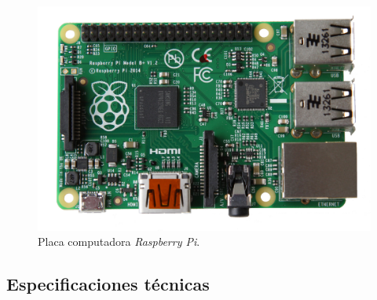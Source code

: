 \smallskip

\begin{figure}[H]
	\noindent \begin{centering}
		\includegraphics[width=\linewidth*2/3]{capitulo3/raspberry}
		\par\end{centering}
	\smallskip
	\caption{\label{fig:raspberry} Placa computadora \textit{Raspberry Pi}.}
\end{figure} 

\smallskip

\subsection{Especificaciones técnicas}

